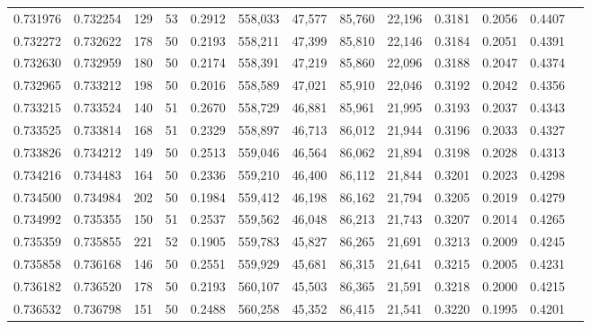 \begin{tabular}{rrrrrrrrrrrrr}
0.731976 & 0.732254 &   129 &  53 &                                     0.2912 & 558,033 &  47,577 &  85,760 &  22,196 & 0.3181 & 0.2056 & 0.4407 \\
0.732272 & 0.732622 &   178 &  50 &                                     0.2193 & 558,211 &  47,399 &  85,810 &  22,146 & 0.3184 & 0.2051 & 0.4391 \\
0.732630 & 0.732959 &   180 &  50 &                                     0.2174 & 558,391 &  47,219 &  85,860 &  22,096 & 0.3188 & 0.2047 & 0.4374 \\
0.732965 & 0.733212 &   198 &  50 &                                     0.2016 & 558,589 &  47,021 &  85,910 &  22,046 & 0.3192 & 0.2042 & 0.4356 \\
0.733215 & 0.733524 &   140 &  51 &                                     0.2670 & 558,729 &  46,881 &  85,961 &  21,995 & 0.3193 & 0.2037 & 0.4343 \\
0.733525 & 0.733814 &   168 &  51 &                                     0.2329 & 558,897 &  46,713 &  86,012 &  21,944 & 0.3196 & 0.2033 & 0.4327 \\
0.733826 & 0.734212 &   149 &  50 &                                     0.2513 & 559,046 &  46,564 &  86,062 &  21,894 & 0.3198 & 0.2028 & 0.4313 \\
0.734216 & 0.734483 &   164 &  50 &                                     0.2336 & 559,210 &  46,400 &  86,112 &  21,844 & 0.3201 & 0.2023 & 0.4298 \\
0.734500 & 0.734984 &   202 &  50 &                                     0.1984 & 559,412 &  46,198 &  86,162 &  21,794 & 0.3205 & 0.2019 & 0.4279 \\
0.734992 & 0.735355 &   150 &  51 &                                     0.2537 & 559,562 &  46,048 &  86,213 &  21,743 & 0.3207 & 0.2014 & 0.4265 \\
0.735359 & 0.735855 &   221 &  52 &                                     0.1905 & 559,783 &  45,827 &  86,265 &  21,691 & 0.3213 & 0.2009 & 0.4245 \\
0.735858 & 0.736168 &   146 &  50 &                                     0.2551 & 559,929 &  45,681 &  86,315 &  21,641 & 0.3215 & 0.2005 & 0.4231 \\
0.736182 & 0.736520 &   178 &  50 &                                     0.2193 & 560,107 &  45,503 &  86,365 &  21,591 & 0.3218 & 0.2000 & 0.4215 \\
0.736532 & 0.736798 &   151 &  50 &                                     0.2488 & 560,258 &  45,352 &  86,415 &  21,541 & 0.3220 & 0.1995 & 0.4201 \\

\end{tabular}

